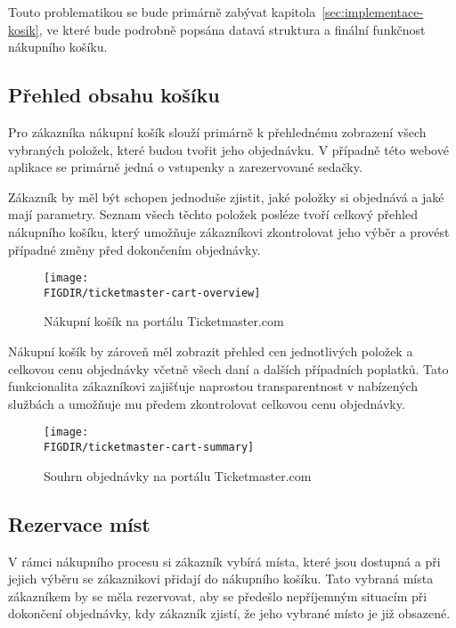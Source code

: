 Touto problematikou se bude primárně zabývat kapitola~\ref{sec:implementace-kosik}, ve které bude podrobně popsána datavá struktura a finální funkčnost nákupního košíku.

\subsection{Přehled obsahu košíku}
\label{sec:specifikace-nakupni-kosik-prehled}
Pro zákazníka nákupní košík slouží primárně k přehlednému zobrazení všech vybraných položek, které budou tvořit jeho objednávku. V případně této webové aplikace se primárně jedná o vstupenky a zarezervované sedačky.

Zákazník by měl být schopen jednoduše zjistit, jaké položky si objednává a jaké mají parametry. Seznam všech těchto položek posléze tvoří celkový přehled nákupního košíku, který umožňuje zákazníkovi zkontrolovat jeho výběr a provést případné změny před dokončením objednávky.

\begin{figure}[H]
    \texttt{[image: \\FIGDIR/ticketmaster-cart-overview]}
    \centering
    \caption{Nákupní košík na portálu Ticketmaster.com}
    \label{fig:ticketmaster-cart-overview}
\end{figure}

Nákupní košík by zároveň měl zobrazit přehled cen jednotlivých položek a celkovou cenu objednávky včetně všech daní a dalších případních poplatků. Tato funkcionalita zákazníkovi zajišťuje naprostou transparentnost v nabízených službách a umožňuje mu předem zkontrolovat celkovou cenu objednávky.

\begin{figure}[H]
    \texttt{[image: \\FIGDIR/ticketmaster-cart-summary]}
    \centering
    \caption{Souhrn objednávky na portálu Ticketmaster.com}
    \label{fig:ticketmaster-cart-summary}
\end{figure}


\subsection{Rezervace míst}
\label{sec:specifikace-nakupni-kosik-rezervace}
V rámci nákupního procesu si zákazník vybírá místa, které jsou dostupná a při jejich výběru se zákaznikovi přidají do nákupního košíku. Tato vybraná místa zákazníkem by se měla rezervovat, aby se předešlo nepříjemným situacím při dokončení objednávky, kdy zákazník zjistí, že jeho vybrané místo je již obsazené.

